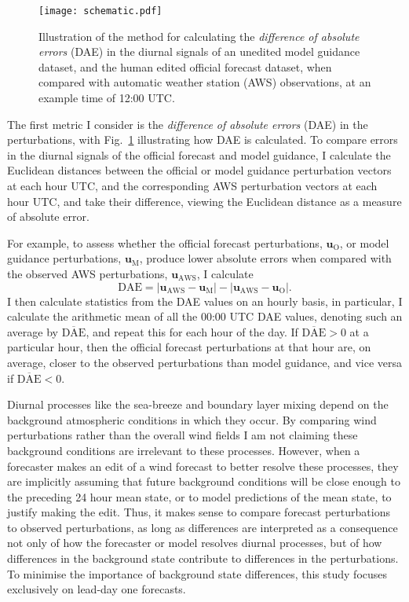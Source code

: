 \documentclass{ametsoc}
\begin{document}
\begin{figure}
\centering
\texttt{[image: schematic.pdf]}
\caption{Illustration of the method for calculating the \textit{difference of absolute errors} (DAE) in the diurnal signals of an unedited model guidance dataset, and the human edited official forecast dataset, when compared with automatic weather station (AWS) observations, at an example time of 12:00 UTC.}
\label{Fig:schematic}
\end{figure}

The first metric I consider is the \textit{difference of absolute errors} (DAE) in the perturbations, with Fig.~\ref{Fig:schematic} illustrating how DAE is calculated. To compare errors in the diurnal signals of the official forecast and model guidance, I calculate the Euclidean distances between the official or model guidance perturbation vectors at each hour UTC, and the corresponding AWS perturbation vectors at each hour UTC, and take their difference, viewing the Euclidean distance as a measure of absolute error.

For example, to assess whether the official forecast perturbations, $\mathbf{u}_{\text{O}}$, or model guidance perturbations, $\mathbf{u}_{\text{M}}$, produce lower absolute errors when compared with the observed AWS perturbations, $\mathbf{u}_{\text{AWS}}$, I calculate 
\begin{equation}
\text{DAE} = \left\lvert \mathbf{u}_{\text{AWS}}-\mathbf{u}_{\text{M}} \right\rvert - \left\lvert \mathbf{u}_{\text{AWS}}-\mathbf{u}_{\text{O}} \right\rvert. \label{Eq:DAE}
\end{equation} 
I then calculate statistics from the DAE values on an hourly basis, in particular, I calculate the arithmetic mean of all the 00:00 UTC DAE values, denoting such an average by $\overline{\text{DAE}}$, and repeat this for each hour of the day. If $\overline{\text{DAE}}>0$ at a particular hour, then the official forecast perturbations at that hour are, on average, closer to the observed perturbations than model guidance, and vice versa if $\overline{\text{DAE}}<0$.

Diurnal processes like the sea-breeze and boundary layer mixing depend on the background atmospheric conditions in which they occur. By comparing wind perturbations rather than the overall wind fields I am not claiming these background conditions are irrelevant to these processes. However, when a forecaster makes an edit of a wind forecast to better resolve these processes, they are implicitly assuming that future background conditions will be close enough to the preceding 24 hour mean state, or to model predictions of the mean state, to justify making the edit. Thus, it makes sense to compare forecast perturbations to observed perturbations, as long as differences are interpreted as a consequence not only of how the forecaster or model resolves diurnal processes, but of how differences in the background state contribute to differences in the perturbations. To minimise the importance of background state differences, this study focuses exclusively on lead-day one forecasts.
\end{document}
